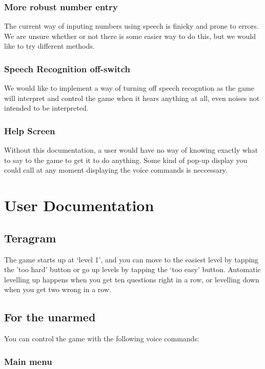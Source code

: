 \documentclass[11pt, oneside]{article}
\begin{document}
\subsubsection*{More robust number entry}
The current way of inputing numbers using speech is finicky and prone to
errors. We are unsure whether or not there is some easier way to do this,
but we would like to try different methods.

\subsubsection*{Speech Recognition off-switch}
We would like to implement a way of turning off speech recogntion as
the game will interpret and control the game when it hears anything at
all, even noises not intended to be interpreted.

\subsubsection*{Help Screen}
Without this documentation, a user would have no way of knowing exactly 
what to say to the game to get it to do anything. Some kind of pop-up 
display you could call at any moment displaying the voice commands is
neccessary.

\pagebreak

\section*{User Documentation}

\subsection*{Teragram}
The game starts up at `level 1', and you can move to the easiest level 
by tapping the 'too hard' button or go up levels by tapping the `too easy' 
button. Automatic levelling up happens when you get ten questions right 
in a row, or levelling down when you get two wrong in a row.


\subsection*{For the unarmed}

You can control the game with the following voice commands:

\subsubsection*{Main menu}
\end{document}
